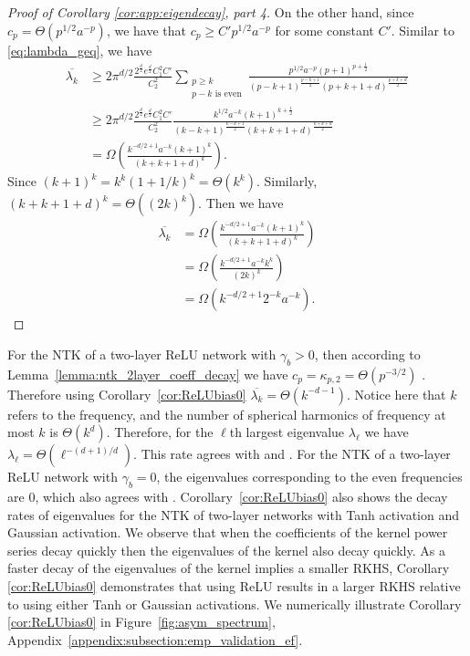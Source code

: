 \begin{proof}[Proof of Corollary \ref{cor:app:eigendecay}, part 4]
On the other hand, since $c_p = \Theta(p^{1/2} a^{-p})$, we have that $c_p\geq C' p^{1/2} a^{-p}$ for some constant $C'$. Similar to \eqref{eq:lambda_geq}, we have
\begin{align}
\overline{\lambda_k} 
&\geq 2\pi^{d/2}\frac{2^{\frac{d}{2}}e^{\frac{d}{2}}C_1^2C'}{C_2^2}\sum_{\substack{p\geq k\\p-k\text{ is even}}} \frac{  p^{1/2} a^{-p}\left({p+1}\right)^{p+\frac{1}{2}}}{\left({p-k+1}\right)^{\frac{p-k+1}{2}}\left({p+k+1+d}\right)^{\frac{p+k+d}{2}}}\\
&\geq 2\pi^{d/2}\frac{2^{\frac{d}{2}}e^{\frac{d}{2}}C_1^2C'}{C_2^2}\frac{  k^{1/2} a^{-k}\left({k+1}\right)^{k+\frac{1}{2}}}{\left({k-k+1}\right)^{\frac{k-k+1}{2}}\left({k+k+1+d}\right)^{\frac{k+k+d}{2}}}\\
&=\Omega\left(\frac{  k^{-d/2+1} a^{-k}\left({k+1}\right)^{k}}{\left({k+k+1+d}\right)^{k}}\right).
\end{align}
Since $\left({k+1}\right)^{k}=k^k(1+1/k)^k=\Theta(k^k)$. Similarly, $\left({k+k+1+d}\right)^{k}=\Theta((2k)^k)$. Then we have
\begin{align}
\overline{\lambda_k} 
&=\Omega\left(\frac{  k^{-d/2+1} a^{-k}\left({k+1}\right)^{k}}{\left({k+k+1+d}\right)^{k}}\right)\\
&=\Omega\left(\frac{  k^{-d/2+1} a^{-k}k^k}{(2k)^{k}}\right)\\
&=\Omega\left(  k^{-d/2+1}2^{-k} a^{-k}\right).
\end{align}
\end{proof}

For the NTK of a two-layer ReLU network with $\gamma_b>0$, then according to Lemma~\ref{lemma:ntk_2layer_coeff_decay} we have  $c_p=\kappa_{p,2}=\Theta(p^{-3/2})$ . 
Therefore using Corollary~\ref{cor:ReLUbias0} $\overline{\lambda_k} = \Theta(k^{-d-1})$. 
Notice here that $k$ refers to the frequency, and the number of spherical harmonics of frequency at most $ k$ is $\Theta(k^d)$. 
Therefore, for the $\ell$th largest eigenvalue $\lambda_\ell$ we have $\lambda_\ell=\Theta(\ell^{-(d+1)/d})$. 
This rate agrees with \cite{uniform_sphere_data} and \cite{NEURIPS2021_14faf969}. 
 For the NTK of a two-layer ReLU network with $\gamma_b=0$, the eigenvalues corresponding to the even frequencies are $0$, which also agrees with \cite{uniform_sphere_data}. 
Corollary~\ref{cor:ReLUbias0} also shows the decay rates of eigenvalues for the NTK of two-layer networks with Tanh activation and Gaussian activation.  We observe that when the coefficients of the kernel power series decay quickly then the eigenvalues of the kernel also decay quickly. As a faster decay of the eigenvalues of the kernel implies a smaller RKHS, Corollary \ref{cor:ReLUbias0} demonstrates that using ReLU results in a larger RKHS relative to using either Tanh or Gaussian activations. We numerically illustrate Corollary \ref{cor:ReLUbias0} in Figure~\ref{fig:asym_spectrum}, Appendix~\ref{appendix:subsection:emp_validation_ef}.


